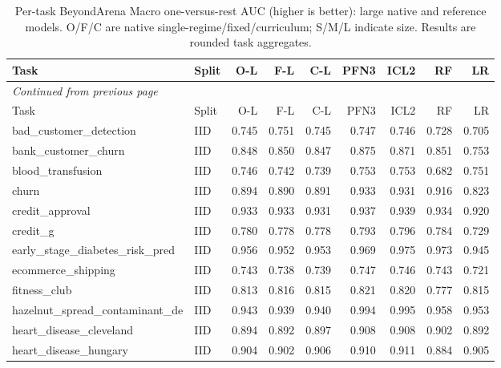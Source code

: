 \begingroup\footnotesize\setlength{\tabcolsep}{3pt}\renewcommand{\arraystretch}{1.15}
\setlength\LTleft{0pt}\setlength\LTright{0pt}
\begin{longtable}{@{}p{3.95cm}lrrrrrrr@{}}
\caption{Per-task BeyondArena Macro one-versus-rest AUC (higher is better): large native and reference models. O/F/C are native single-regime/fixed/curriculum; S/M/L indicate size. Results are rounded task aggregates.}\label{tab:auclarge}\\
\toprule Task & Split & O-L & F-L & C-L & PFN3 & ICL2 & RF & LR\\\midrule
\endfirsthead
\multicolumn{9}{l}{\emph{Continued from previous page}}\\\toprule
Task & Split & O-L & F-L & C-L & PFN3 & ICL2 & RF & LR\\\midrule\endhead
\bottomrule\endfoot
bad\_\allowbreak{}customer\_\allowbreak{}detection & IID & 0.745 & 0.751 & 0.745 & 0.747 & 0.746 & 0.728 & 0.705\\
bank\_\allowbreak{}customer\_\allowbreak{}churn & IID & 0.848 & 0.850 & 0.847 & 0.875 & 0.871 & 0.851 & 0.753\\
blood\_\allowbreak{}transfusion & IID & 0.746 & 0.742 & 0.739 & 0.753 & 0.753 & 0.682 & 0.751\\
churn & IID & 0.894 & 0.890 & 0.891 & 0.933 & 0.931 & 0.916 & 0.823\\
credit\_\allowbreak{}approval & IID & 0.933 & 0.933 & 0.931 & 0.937 & 0.939 & 0.934 & 0.920\\
credit\_\allowbreak{}g & IID & 0.780 & 0.778 & 0.778 & 0.793 & 0.796 & 0.784 & 0.729\\
early\_\allowbreak{}stage\_\allowbreak{}diabetes\_\allowbreak{}risk\_\allowbreak{}pred & IID & 0.956 & 0.952 & 0.953 & 0.969 & 0.975 & 0.973 & 0.945\\
ecommerce\_\allowbreak{}shipping & IID & 0.743 & 0.738 & 0.739 & 0.747 & 0.746 & 0.743 & 0.721\\
fitness\_\allowbreak{}club & IID & 0.813 & 0.816 & 0.815 & 0.821 & 0.820 & 0.777 & 0.815\\
hazelnut\_\allowbreak{}spread\_\allowbreak{}contaminant\_\allowbreak{}de & IID & 0.943 & 0.939 & 0.940 & 0.994 & 0.995 & 0.958 & 0.953\\
heart\_\allowbreak{}disease\_\allowbreak{}cleveland & IID & 0.894 & 0.892 & 0.897 & 0.908 & 0.908 & 0.902 & 0.892\\
heart\_\allowbreak{}disease\_\allowbreak{}hungary & IID & 0.904 & 0.902 & 0.906 & 0.910 & 0.911 & 0.884 & 0.905\\

\end{longtable}
